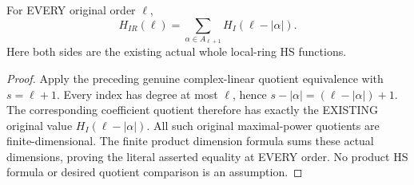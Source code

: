 \begin{theorem}
\label{hir:actual-product-original-ambient-hs-convolution}
\leanok
For EVERY original order $\ell$,
\[
 H_{IR}(\ell)=\sum_{\alpha\in A_{\ell+1}} H_I(\ell-|\alpha|).
\]
Here both sides are the existing actual whole local-ring HS functions.
\end{theorem}
\begin{proof}
Apply the preceding genuine complex-linear quotient equivalence with
$s=\ell+1$. Every index has degree at most $\ell$, hence
$s-|\alpha|=(\ell-|\alpha|)+1$. The corresponding coefficient quotient
therefore has exactly the EXISTING original value
$H_I(\ell-|\alpha|)$. All such original maximal-power quotients are
finite-dimensional. The finite product dimension formula sums these
actual dimensions, proving the literal asserted equality at EVERY order.
No product HS formula or desired quotient comparison is an assumption.
\end{proof}
